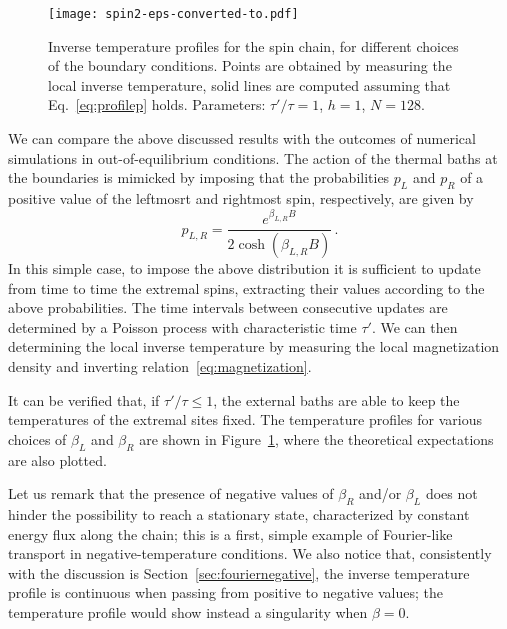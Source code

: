 \documentclass[iop, twocolumns, amssymb,notitlepage]{revtex4-1}
\newcommand{\hh}{B}
\begin{document}
 \begin{figure}
 \centering
\texttt{[image: spin2-eps-converted-to.pdf]}
\caption{\label{fig:spin2} Inverse temperature profiles for the spin chain, for different choices of the boundary conditions.
Points are obtained by measuring the local inverse temperature, solid lines are computed assuming that
Eq.~\eqref{eq:profilep} holds. Parameters: $\tau'/\tau=1$, $h=1$, $N=128$.}
 \end{figure}
  
  
  We can compare the above discussed results with the outcomes of numerical 
simulations in out-of-equilibrium conditions. The action of the thermal baths at 
the boundaries is mimicked by imposing that the probabilities $p_L$ and $p_R$
of a positive value of the leftmosrt and rightmost spin, respectively, are given by 
\begin{equation}
   p_{L,R}=\frac{e^{\beta_{L,R} \hh}}{2 \cosh(\beta_{L,R} \hh)}\,.
  \end{equation} 
  In this simple case, to impose the above distribution it is sufficient to
  update from time to time the extremal spins, extracting their values according
  to the above probabilities.
 The time intervals between consecutive updates are determined by a Poisson 
process with characteristic time $ \tau'$. We can then determining the local 
inverse temperature by measuring the local magnetization density and inverting 
relation~\eqref{eq:magnetization}. 
\iffalse
Figure~\ref{fig:spin1} shows  the inverse 
temperature profiles obtained for two different choices of $\beta_R$ and 
$\beta_L$. The stationary state of the chain clearly depends on the choice of 
the parameter $\gamma=\tau/\tau'$, ruling the update frequency of the baths.
\fi
It can be verified that, if $\tau'/\tau \le 1$, the external baths are able to keep
the temperatures of the extremal sites fixed. The temperature profiles
for various choices of $\beta_L$ and $\beta_R$ are shown in 
Figure~\ref{fig:spin2}, where the theoretical expectations are also plotted.
 
 Let us remark that the presence of negative values of $\beta_R$ and/or 
$\beta_L$ does not hinder the possibility to reach a stationary state, 
characterized by constant energy flux along the chain; this is a first, simple 
example of Fourier-like transport in negative-temperature conditions. We 
also notice that, consistently with the discussion is 
Section~\ref{sec:fouriernegative}, the inverse temperature profile is continuous 
when passing from positive to negative values; the temperature profile would 
show instead a singularity when $\beta=0$.
\end{document}
